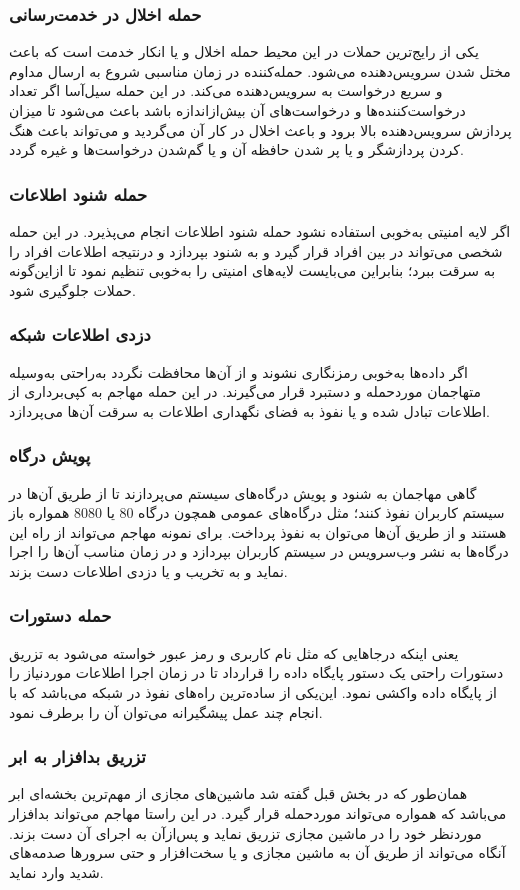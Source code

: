 \documentclass[a4paper,oneside,12pt]{report}
\begin{document}
\subsubsection{حمله اخلال در خدمت‌رسانی}
یکی از رایج‌ترین حملات در این محیط حمله اخلال و یا انکار خدمت است که باعث مختل شدن سرویس‌دهنده می‌شود. حمله‌کننده در زمان مناسبی شروع به ارسال مداوم و سریع درخواست به سرویس‌دهنده می‌کند. در این حمله سیل‌آسا اگر تعداد درخواست‌کننده‌ها و درخواست‌های آن بیش‌ازاندازه باشد باعث می‌شود تا میزان پردازش سرویس‌دهنده بالا برود و باعث اخلال در کار آن می‌گردید و می‌تواند باعث هنگ کردن پردازشگر و یا پر شدن حافظه آن و یا گم‌شدن درخواست‌ها و غیره گردد.
\subsubsection{حمله شنود اطلاعات}
اگر لایه امنیتی 
به‌خوبی استفاده نشود حمله شنود اطلاعات انجام می‌پذیرد. در این حمله شخصی می‌تواند در بین افراد قرار گیرد و به شنود بپردازد و درنتیجه اطلاعات افراد را به سرقت ببرد؛ بنابراین می‌بایست لایه‌های امنیتی را به‌خوبی تنظیم نمود تا ازاین‌گونه حملات جلوگیری شود.
\subsubsection{دزدی اطلاعات شبکه}
اگر داده‌ها به‌خوبی رمزنگاری نشوند و از آن‌ها محافظت نگردد به‌راحتی به‌وسیله متهاجمان موردحمله و دستبرد قرار می‌گیرند. در این حمله مهاجم به کپی‌برداری از اطلاعات تبادل شده و یا نفوذ به فضای نگهداری اطلاعات به سرقت آن‌ها می‌پردازد.
\subsubsection{پویش درگاه}
گاهی مهاجمان به شنود و پویش درگاه‌های سیستم می‌پردازند تا از طریق آن‌ها در سیستم کاربران نفوذ کنند؛ مثل درگاه‌های عمومی همچون درگاه 
$80$
یا 
$8080$ 
همواره باز هستند و از طریق آن‌ها می‌توان به نفوذ پرداخت. برای نمونه مهاجم می‌تواند از راه این درگاه‌ها به نشر وب‌سرویس در سیستم کاربران بپردازد و در زمان مناسب آن‌ها را اجرا نماید و به تخریب و یا دزدی اطلاعات دست بزند.
\subsubsection{حمله دستورات 
}
یعنی اینکه درجاهایی که مثل نام کاربری و رمز عبور خواسته می‌شود به 
تزریق دستورات راحتی یک دستور پایگاه داده را قرارداد تا در زمان اجرا اطلاعات موردنیاز را از پایگاه داده واکشی نمود. این‌یکی از ساده‌ترین راه‌های نفوذ در شبکه می‌باشد که با انجام چند عمل پیشگیرانه می‌توان آن را برطرف نمود.
\subsubsection{تزریق بدافزار به ابر}
همان‌طور که در بخش قبل گفته شد ماشین‌های مجازی از مهم‌ترین بخشه‌ای ابر می‌باشد که همواره می‌تواند موردحمله قرار گیرد. در این راستا مهاجم می‌تواند بدافزار موردنظر خود را در ماشین مجازی تزریق نماید و پس‌ازآن به اجرای آن دست بزند. آنگاه می‌تواند از طریق آن به ماشین مجازی و یا سخت‌افزار و حتی سرورها صدمه‌های شدید وارد نماید.
\end{document}

